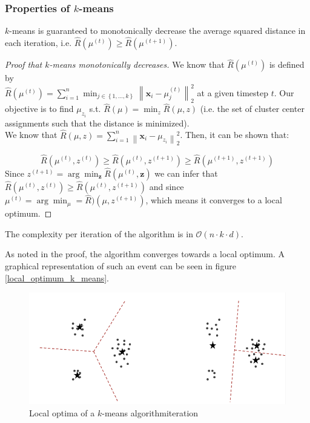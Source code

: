 \documentclass[a4paper,10pt,twoside]{article}
\newcommand\norm[1]{\left\lVert#1\right\rVert}
\begin{document}
\subsubsection{Properties of $k$-means}

$k$-means is guaranteed to monotonically decrease the average squared distance in each iteration, i.e. $\hat{R}(\mu^{(t)})\geq\hat{R}(\mu^{(t+1)})$.

\begin{proof}[Proof that $k$-means monotonically decreases]
    We know that $\hat{R}(\mu^{(t)})$ is defined by \\
    $\hat{R}(\mu^{(t)})=\sum_{i=1}^{n}\min_{j\in\left\{1,\ldots, k\right\}}\norm{\mathbf{x}_i-\mu_j^{(t)}}_2^2$ at a given timestep $t$. Our objective is to find $\mu_{z_i}$ s.t. $\hat{R}(\mu)=\min_{z}\hat{R}(\mu, z)$ (i.e. the set of cluster center assignments such that the distance is minimized). \\

    We know that $\hat{R}(\mu,z)=\sum_{i=1}^{n}\norm{\mathbf{x}_i-\mu_{z_i}}_2^2$. Then, it can be shown that:


    \begin{equation*}
        \hat{R}(\mu^{(t)}, z^{(t)})\geq \hat{R}(\mu^{(t)}, z^{(t+1)})\geq \hat{R}(\mu^{(t+1)}, z^{(t+1)})
    \end{equation*}
    Since $z^{(t+1)}=\arg\min_{\mathbf{z}}\hat{R}(\mu^{(t)}, \mathbf{z})$ we can infer that $\hat{R}(\mu^{(t)}, z^{(t)})\geq \hat{R}(\mu^{(t)}, z^{(t+1)})$ and since $\mu^{(t)}=\arg\min_{\mu}=\hat{R})(\mu, z^{(t+1)})$, which means it converges to a local optimum.
\end{proof}

The complexity per iteration of the algorithm is in $\mathcal{O}(n\cdot k\cdot d)$.

As noted in the proof, the algorithm converges towards a local optimum. A graphical representation of such an event can be seen in figure \ref{local_optimum_k_means}.

\begin{figure}
    \centering
    \includegraphics[width=.5\textwidth]{figures/local_optimum_k_means.png}
    \caption{Local optima of a $k$-means algorithmiteration}
    \label{local_optimum_knn}
\end{figure}
\end{document}
